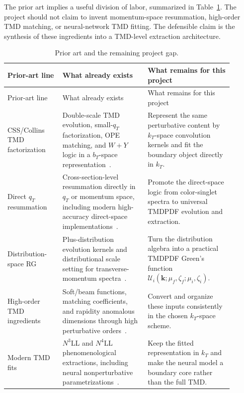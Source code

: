 \documentclass[11pt]{article}
\newcommand{\bk}{\bm{k}}
\begin{document}
The prior art implies a useful division of labor, summarized in
Table~\ref{tab:prior-art-gap}. The project should not claim to invent momentum-space
resummation, high-order TMD matching, or neural-network TMD fitting. The defensible
claim is the synthesis of these ingredients into a TMD-level extraction architecture.

\begin{longtable}{p{0.22\linewidth} p{0.34\linewidth} p{0.34\linewidth}}
\caption{Prior art and the remaining project gap.}\label{tab:prior-art-gap}\\
\toprule
Prior-art line & What already exists & What remains for this project \\
\midrule
\endfirsthead
\toprule
Prior-art line & What already exists & What remains for this project \\
\midrule
\endhead
CSS/Collins TMD factorization & Double-scale TMD evolution, small-$q_T$ factorization, OPE matching, and $W+Y$ logic in a $b_T$-space representation~\cite{CSS1985,Collins2011}. & Represent the same perturbative content by $k_T$-space convolution kernels and fit the boundary object directly in $k_T$. \\
\addlinespace
Direct $q_T$ resummation & Cross-section-level resummation directly in $q_T$ or momentum space, including modern high-accuracy direct-space implementations~\cite{EllisVeseli1998,MonniReTorrielli2016,BizonMonniReRottoliTorrielli2018}. & Promote the direct-space logic from color-singlet spectra to universal TMDPDF evolution and extraction. \\
\addlinespace
Distribution-space RG & Plus-distribution evolution kernels and distributional scale setting for transverse-momentum spectra~\cite{EbertTackmann2017}. & Turn the distribution algebra into a practical TMDPDF Green's function $\mathcal U_i(\bk;\mu_f,\zeta_f;\mu_i,\zeta_i)$. \\
\addlinespace
High-order TMD ingredients & Soft/beam functions, matching coefficients, and rapidity anomalous dimensions through high perturbative orders~\cite{LuebbertOredssonStahlhofen2016,EbertMistlbergerVita2020,LuoYangZhuZhu2021,MoultZhuZhu2022}. & Convert and organize these inputs consistently in the chosen $k_T$-space scheme. \\
\addlinespace
Modern TMD fits & $N^3$LL and $N^4$LL phenomenological extractions, including neural nonperturbative parametrizations~\cite{MoosScimemiVladimirovZurita2024,MoosScimemiVladimirovZurita2025,BacchettaEtAl2025NN}. & Keep the fitted representation in $k_T$ and make the neural model a boundary core rather than the full TMD. \\

\end{longtable}
\end{document}
